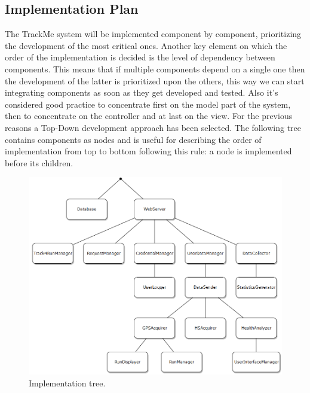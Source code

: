 \subsection{Implementation Plan}
The TrackMe system will be implemented component by component, prioritizing the development of the most critical ones. Another key element on which the order of the implementation is decided is the level of dependency between components. This means that if multiple components depend on a single one then the development of the latter is prioritized upon the others, this way we can start integrating components as soon as they get developed and tested. Also it's considered good practice to concentrate first on the model part of the system, then to concentrate on the controller and at last on the view. For the previous reasons a Top-Down development approach has been selected.
\medbreak
\noindent
The following tree contains components as nodes and is useful for describing the order of implementation from top to bottom following this rule: a node is implemented before its children.

\begin{figure}[H]
\centering
\includegraphics[scale=0.7]{Images/ImplementationPlan.png}
\caption{Implementation tree.}
\end{figure}

